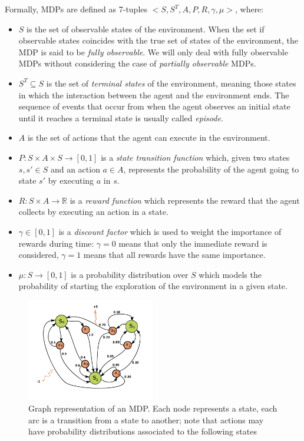 Formally, MDPs are defined as 7-tuples $<S, S^{T}, A, P, R, \gamma, \mu>$, 
where:
\begin{itemize}
    \item $S$ is the set of observable states of the environment.
    When the set if observable states coincides with the true set of states of 
    the environment, the MDP is said to be \textit{fully observable}. We will 
    only deal with fully observable MDPs without considering the case of 
    \textit{partially observable} MDPs.

    \item $S^{T} \subseteq S$ is the set of \textit{terminal states} of the 
    environment, meaning those states in which the interaction between the agent
    and the environment ends. The sequence of events that occur from when the
    agent observes an initial state until it reaches a terminal state is 
    usually called \textit{episode}.
 
    \item $A$ is the set of actions that the agent can execute in the 
    environment.
 
    \item $P: S \times A \times S \rightarrow [0,1]$ is a \textit{state 
    transition function} which, given two states $s, s' \in S$ and an action 
    $a \in A$, represents the probability of the agent going to state $s'$ by 
    executing $a$ in $s$.
 
    \item $R: S \times A \rightarrow \mathbb{R}$ is a \textit{reward function} 
    which represents the reward that the agent collects by executing an action 
    in a state. 
    
    \item $\gamma \in [0,1]$ is a \textit{discount factor} which is used to 
    weight the importance of rewards during time: $\gamma = 0$ means that only
    the immediate reward is considered, $\gamma = 1$ means that all rewards have
    the same importance.
    
    \item $\mu: S \rightarrow [0, 1]$ is a probability distribution over $S$ 
    which models the probability of starting the exploration of the environment 
    in a given state.
\end{itemize}
%
\begin{figure}[h]
\includegraphics[width=0.5\textwidth]{pictures/mdp}
\centering
\caption[Graph representation of an MDP]{Graph representation of an MDP. Each 
	node represents a state, each arc is a transition from a state to 
	another; note that actions may have probability distributions associated 
	to the following states}
\end{figure}
%

